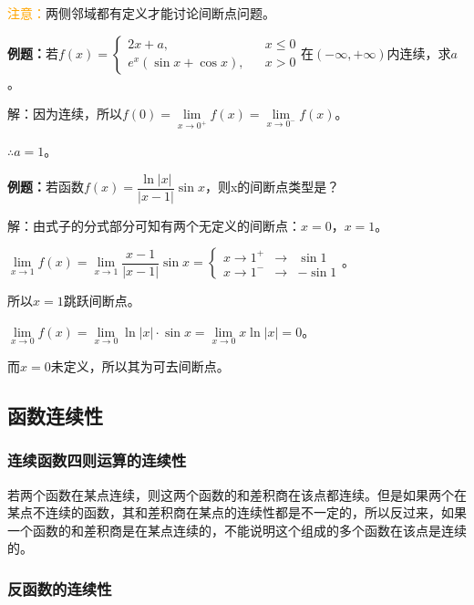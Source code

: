 \documentclass[UTF8, 12pt]{ctexart}
\begin{document}
        \textcolor{orange}{注意：}两侧邻域都有定义才能讨论间断点问题。\medskip

        \textbf{例题：}若$f(x)=\left\{
        \begin{array}{lcl}
            2x+a, & & x\leqslant 0 \\
            e^x(\sin x+\cos x), & & x>0
        \end{array} \right.
        $在$(-\infty,+\infty)$内连续，求$a$。

        解：因为连续，所以$f(0)=\lim\limits_{x\to 0^+}f(x)=\lim\limits_{x\to 0^-}f(x)$。

        $\therefore a=1$。

        \textbf{例题：}若函数$f(x)=\dfrac{\ln\vert x\vert}{\vert x-1\vert}\sin x$，则x的间断点类型是？\medskip

        解：由式子的分式部分可知有两个无定义的间断点：$x=0$，$x=1$。\medskip

        $\lim\limits_{x\to 1}f(x)=\lim\limits_{x\to 1}\dfrac{x-1}{\vert x-1\vert}\sin x=\left\{
        \begin{array}{lcl}
            x\to 1^+ & \rightarrow & \sin 1 \\
            x\to 1^- & \rightarrow & -\sin 1
        \end{array} \right.
        $。

        所以$x=1$跳跃间断点。

        $\lim\limits_{x\to 0}f(x)=\lim\limits_{x\to 0}\ln\vert x\vert\cdot\sin x=\lim\limits_{x\to 0}x\ln\vert x\vert=0$。

        而$x=0$未定义，所以其为可去间断点。

        \subsection{函数连续性}

        \subsubsection{连续函数四则运算的连续性}

        若两个函数在某点连续，则这两个函数的和差积商在该点都连续。但是如果两个在某点不连续的函数，其和差积商在某点的连续性都是不一定的，所以反过来，如果一个函数的和差积商是在某点连续的，不能说明这个组成的多个函数在该点是连续的。

        \subsubsection{反函数的连续性}
\end{document}
